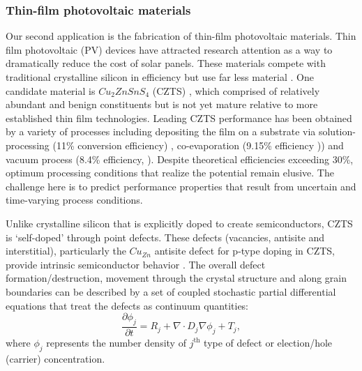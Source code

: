 \documentclass[11pt]{article}
\begin{document}
\subsubsection*{Thin-film photovoltaic materials}
Our second  application 
is the fabrication of thin-film photovoltaic
materials. 
Thin film photovoltaic (PV) devices have attracted research attention
as a way to dramatically reduce the cost of solar panels. These
materials compete with traditional crystalline silicon in efficiency but use far less
material \cite{JiangY13}. 
One candidate material is $Cu_2ZnSnS_4$ (CZTS) \cite{JiangY13}, which
comprised of relatively abundant and benign constituents but is not yet mature relative to more established thin film technologies. 
Leading  CZTS  performance has been obtained by a variety of processes including depositing the film on a substrate via
solution-processing (11\% conversion efficiency) \cite{Todorov13},
co-evaporation (9.15\% efficiency \cite{Repins12})) and vacuum
process (8.4\% efficiency, \cite{Shin11}). Despite theoretical
efficiencies exceeding 30\%,  optimum processing conditions
that realize the potential remain elusive.
The challenge here is to 
predict performance properties that result from uncertain and time-varying process
conditions.

Unlike crystalline silicon that is explicitly doped
to create  semiconductors, CZTS is
`self-doped' through point defects.
These defects (vacancies, antisite and interstitial), particularly
the $Cu_{Zn}$ antisite defect for p-type doping in CZTS, provide intrinsic 
semiconductor behavior
\cite{JiangY13}. The overall defect formation/destruction, movement
through the crystal structure and along grain boundaries can be
described by a set of coupled stochastic partial differential
equations that treat the defects as continuum
quantities:
\begin{equation}
  \label{eq:pdpde}
  \frac{\partial \phi_j}{\partial t}  = R_j + \nabla \cdot  D_j \nabla \phi_j  + T_j,
\end{equation}
where $\phi_j$ represents the number density of $j^\mathrm{th}$ type
of defect or election/hole (carrier) concentration. 
\end{document}

